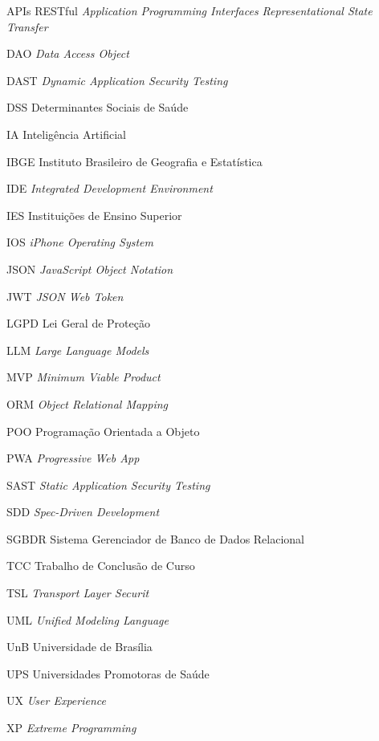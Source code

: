 \begin{siglas}
     \item[APIs RESTful] \textit{Application Programming Interfaces Representational State Transfer}
    \item[DAO] \textit{Data Access Object}
     \item[DAST] \textit{Dynamic Application Security Testing}
    \item[DSS] Determinantes Sociais de Saúde
     \item[IA] Inteligência Artificial
    \item[IBGE] Instituto Brasileiro de Geografia e Estatística
    \item[IDE] \textit{Integrated Development Environment}
    \item[IES] Instituições de Ensino Superior
    \item[IOS] \textit{iPhone Operating System}
    \item[JSON] \textit{JavaScript Object Notation}
    \item[JWT] \textit{JSON Web Token}
    \item[LGPD] Lei Geral de Proteção
     \item[LLM] \textit{Large Language Models}
    \item[MVP] \textit{Minimum Viable Product}
    \item[ORM] \textit{Object Relational Mapping}
    \item[POO] Programação Orientada a Objeto
     \item[PWA] \textit{Progressive Web App}
     \item[SAST] \textit{Static Application Security Testing}
     \item[SDD] \textit{Spec-Driven Development}
     \item[SGBDR] Sistema Gerenciador de Banco de Dados Relacional
    \item[TCC] Trabalho de Conclusão de Curso
    \item[TSL] \textit{Transport Layer Securit}
    \item[UML] \textit{Unified Modeling Language}
    \item[UnB] Universidade de Brasília
    \item[UPS] Universidades Promotoras de Saúde
    \item[UX] \textit{User Experience}
    \item[XP] \textit{Extreme Programming}
\end{siglas}
